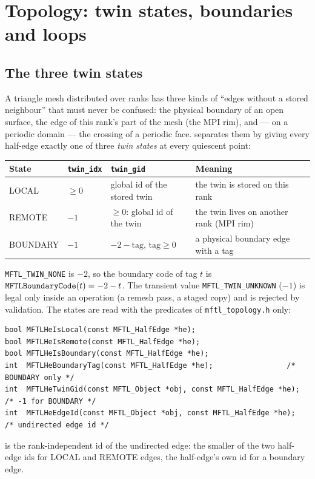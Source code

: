\chapter{Topology: twin states, boundaries and loops}
\label{ch:topology}

\section{The three twin states}

A triangle mesh distributed over ranks has three kinds of ``edges without a stored
neighbour'' that must never be confused: the physical boundary of an open surface, the edge of
this rank's part of the mesh (the MPI rim), and --- on a periodic domain --- the crossing of a
periodic face. \mftl{} separates them by giving every half-edge exactly one of three
\emph{twin states} at every quiescent point:

\begin{center}\small
\begin{tabular}{@{}llll@{}}
\toprule
State & \texttt{twin\_idx} & \texttt{twin\_gid} & Meaning \\
\midrule
LOCAL & $\ge 0$ & global id of the stored twin & the twin is stored on this rank \\
REMOTE & $-1$ & $\ge 0$: global id of the twin & the twin lives on another rank (MPI rim) \\
BOUNDARY & $-1$ & $-2-\text{tag}$, $\text{tag}\ge0$ & a physical boundary edge with a tag \\
\bottomrule
\end{tabular}
\end{center}

\texttt{MFTL\_TWIN\_NONE} is $-2$, so the boundary code of tag $t$ is
$\texttt{MFTLBoundaryCode}(t)=-2-t$. The transient value \texttt{MFTL\_TWIN\_UNKNOWN} ($-1$) is legal
only inside an operation (a remesh pass, a staged copy) and is rejected by validation. The
states are read with the predicates of \texttt{mftl\_topology.h} only:

\begin{lstlisting}[numbers=none]
bool MFTLHeIsLocal(const MFTL_HalfEdge *he);
bool MFTLHeIsRemote(const MFTL_HalfEdge *he);
bool MFTLHeIsBoundary(const MFTL_HalfEdge *he);
int  MFTLHeBoundaryTag(const MFTL_HalfEdge *he);                 /* BOUNDARY only */
int  MFTLHeTwinGid(const MFTL_Object *obj, const MFTL_HalfEdge *he); /* -1 for BOUNDARY */
int  MFTLHeEdgeId(const MFTL_Object *obj, const MFTL_HalfEdge *he);  /* undirected edge id */
\end{lstlisting}
 is the rank-independent id of the undirected edge: the smaller of the two
half-edge ids for LOCAL and REMOTE edges, the half-edge's own id for a boundary edge.

